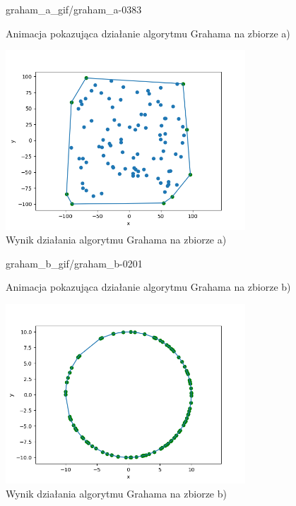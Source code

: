 \documentclass[a4paper]{article}
\begin{document}
\begin{figure}[H]
    {graham_a_gif/graham_a-}{0}{383}
    \centering
    \caption{Animacja pokazująca działanie algorytmu Grahama na zbiorze a)}
    \label{fig:anim_graham_a}
\end{figure}

\begin{figure}[H]
    \centering
    \includegraphics[width=0.8\textwidth]{graham/graham_a_png.png}
    \caption{Wynik działania algorytmu Grahama na zbiorze a)}
    \label{fig:graham_a}
\end{figure}

\begin{figure}[H]
    {graham_b_gif/graham_b-}{0}{201}
    \centering
    \caption{Animacja pokazująca działanie algorytmu Grahama na zbiorze b)}
    \label{fig:anim_graham_b}
\end{figure}

\begin{figure}[H]
    \centering
    \includegraphics[width=0.8\textwidth]{graham/graham_b_png.png}
    \caption{Wynik działania algorytmu Grahama na zbiorze b)}
    \label{fig:graham_b}
\end{figure}
\end{document}
